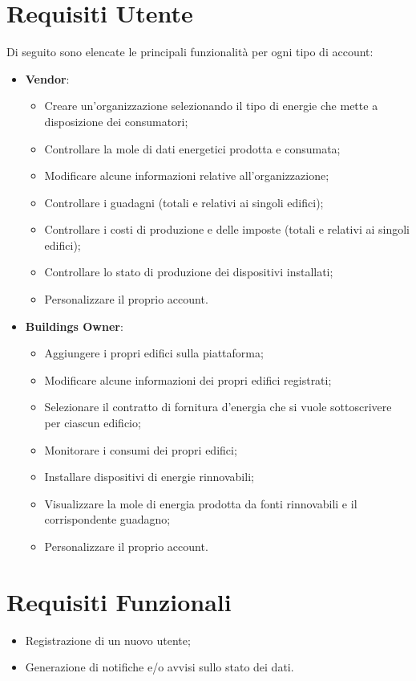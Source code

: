 \documentclass{report}
\begin{document}
\section{Requisiti Utente}
\par Di seguito sono elencate le principali funzionalità per ogni tipo di account:
\begin{itemize}
  \item \textbf{Vendor}:
  \begin{itemize}
   \item Creare un'organizzazione selezionando il tipo di energie che mette a disposizione dei consumatori;
         \item  Controllare la mole di dati energetici prodotta e consumata; 
         \item Modificare alcune informazioni relative all'organizzazione;
         \item  Controllare i guadagni (totali e relativi ai singoli edifici); 
         \item  Controllare i costi di produzione e delle imposte (totali e relativi ai singoli edifici);
         \item  Controllare lo stato di produzione dei dispositivi installati;
         \item  Personalizzare il proprio account.            
 \end{itemize}
 \item \textbf{Buildings Owner}: 
   \begin{itemize}
   \item Aggiungere i propri edifici sulla piattaforma;
   \item Modificare alcune informazioni dei propri edifici registrati;
      \item Selezionare il contratto di fornitura d'energia che si vuole sottoscrivere per ciascun edificio;
      \item  Monitorare i consumi dei propri edifici;  
         \item  Installare dispositivi di energie rinnovabili;
         \item  Visualizzare la mole di energia prodotta da fonti rinnovabili e il corrispondente guadagno;
         \item Personalizzare il proprio account.            
 \end{itemize}
 \end{itemize}
 
\section{Requisiti Funzionali}
\begin{itemize}
\item Registrazione di un nuovo utente;
\item  Generazione di notifiche e/o avvisi sullo stato dei dati.
\end{itemize}
\end{document}
